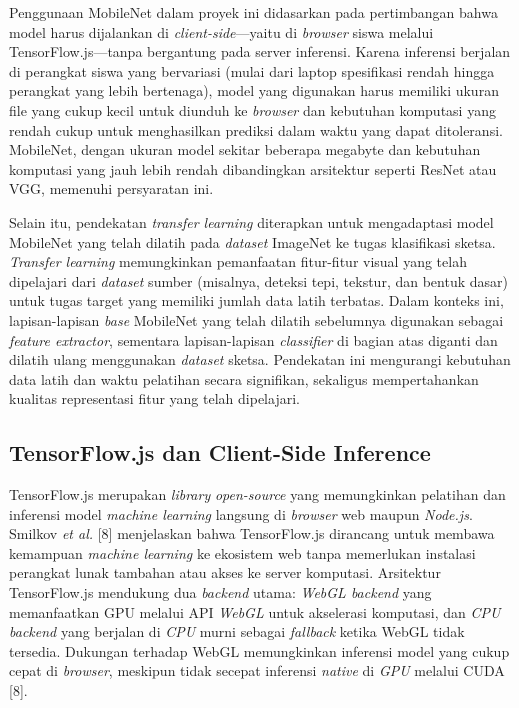 \documentclass[10pt,twoside,openright]{report}
\begin{document}
Penggunaan MobileNet dalam proyek ini didasarkan pada pertimbangan bahwa model harus dijalankan di \textit{client-side}—yaitu di \textit{browser} siswa melalui TensorFlow.js—tanpa bergantung pada server inferensi. Karena inferensi berjalan di perangkat siswa yang bervariasi (mulai dari laptop spesifikasi rendah hingga perangkat yang lebih bertenaga), model yang digunakan harus memiliki ukuran file yang cukup kecil untuk diunduh ke \textit{browser} dan kebutuhan komputasi yang rendah cukup untuk menghasilkan prediksi dalam waktu yang dapat ditoleransi. MobileNet, dengan ukuran model sekitar beberapa megabyte dan kebutuhan komputasi yang jauh lebih rendah dibandingkan arsitektur seperti ResNet atau VGG, memenuhi persyaratan ini.

Selain itu, pendekatan \textit{transfer learning} diterapkan untuk mengadaptasi model MobileNet yang telah dilatih pada \textit{dataset} ImageNet ke tugas klasifikasi sketsa. \textit{Transfer learning} memungkinkan pemanfaatan fitur-fitur visual yang telah dipelajari dari \textit{dataset} sumber (misalnya, deteksi tepi, tekstur, dan bentuk dasar) untuk tugas target yang memiliki jumlah data latih terbatas. Dalam konteks ini, lapisan-lapisan \textit{base} MobileNet yang telah dilatih sebelumnya digunakan sebagai \textit{feature extractor}, sementara lapisan-lapisan \textit{classifier} di bagian atas diganti dan dilatih ulang menggunakan \textit{dataset} sketsa. Pendekatan ini mengurangi kebutuhan data latih dan waktu pelatihan secara signifikan, sekaligus mempertahankan kualitas representasi fitur yang telah dipelajari.

\subsection{TensorFlow.js dan Client-Side Inference}
\label{subsec:tfjs-client-side}

TensorFlow.js merupakan \textit{library} \textit{open-source} yang memungkinkan pelatihan dan inferensi model \textit{machine learning} langsung di \textit{browser} web maupun \textit{Node.js}. Smilkov \textit{et al.} [8] menjelaskan bahwa TensorFlow.js dirancang untuk membawa kemampuan \textit{machine learning} ke ekosistem web tanpa memerlukan instalasi perangkat lunak tambahan atau akses ke server komputasi. Arsitektur TensorFlow.js mendukung dua \textit{backend} utama: \textit{WebGL backend} yang memanfaatkan GPU melalui API \textit{WebGL} untuk akselerasi komputasi, dan \textit{CPU backend} yang berjalan di \textit{CPU} murni sebagai \textit{fallback} ketika WebGL tidak tersedia. Dukungan terhadap WebGL memungkinkan inferensi model yang cukup cepat di \textit{browser}, meskipun tidak secepat inferensi \textit{native} di \textit{GPU} melalui CUDA [8].
\end{document}
